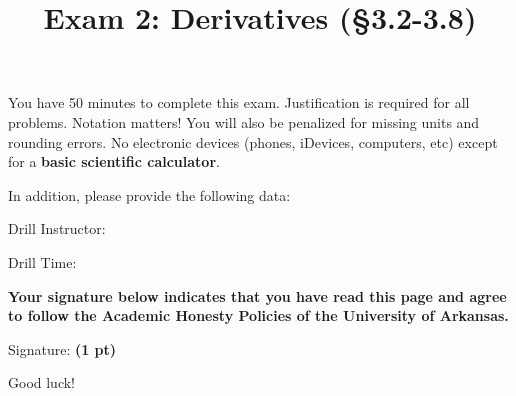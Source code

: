 \documentclass[12pt]{article}
\title{\vspace{-8pc}
\vfill{\Huge
	\bf Exam 2: Derivatives (\S 3.2-3.8)} 
	}
\author{}
\date{}
\begin{document}
\maketitle
\vspace{-3pc}
 You have 50 minutes to complete this exam.  Justification is required for all problems.  Notation matters!  You will also be penalized for missing units and rounding errors.  No electronic devices (phones, iDevices, computers, etc) except for a \textbf{basic scientific calculator}.  %

\begin{flushright}
In addition, please provide the following data:

\vspace{1.5pc}
Drill Instructor: \underline{\hspace{40ex}}

\vspace{1.5pc}
Drill Time: \underline{\hspace{40ex}}
\end{flushright}

\vfill
\noindent\textbf{Your signature below indicates that you have read this page and agree to follow the Academic Honesty Policies of the University of Arkansas.}  

\vspace{2pc}
\noindent Signature: {\bf (1 pt)} \underline{\hspace{73ex}}

\begin{flushright}\Large Good luck!\end{flushright}
\end{document}
